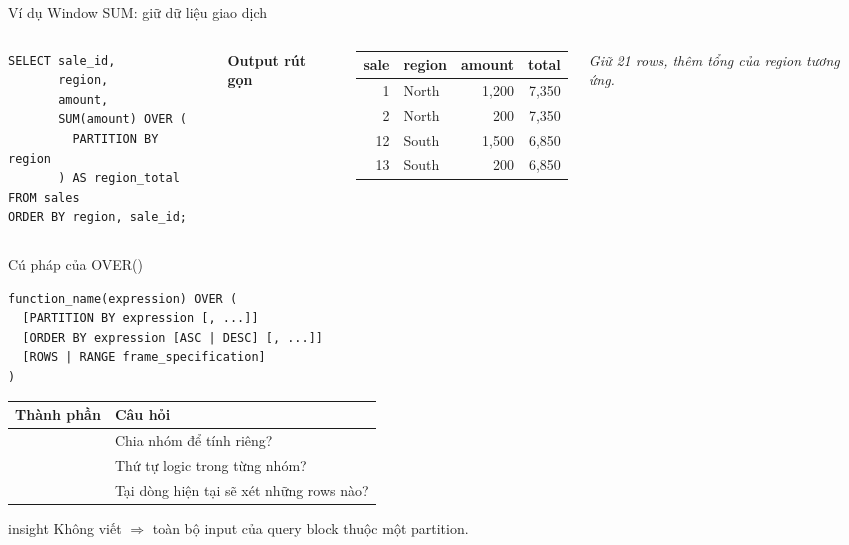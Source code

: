 \documentclass[aspectratio=169,11pt]{beamer}
\newcommand{\code}[1]{{\small\ttfamily\detokenize{#1}}}
\begin{document}
\begin{frame}[fragile]{Ví dụ Window SUM: giữ dữ liệu giao dịch}
\begin{columns}[T,onlytextwidth]
\begin{lstlisting}[basicstyle=\ttfamily\fontsize{8.3}{9.5}\selectfont]
SELECT sale_id,
       region,
       amount,
       SUM(amount) OVER (
         PARTITION BY region
       ) AS region_total
FROM sales
ORDER BY region, sale_id;
\end{lstlisting}

\footnotesize\textbf{Output rút gọn}
\begin{center}
\renewcommand{\arraystretch}{1.18}
\begin{tabular}{rlrr}
\toprule
sale & region & amount & total \\
\midrule
1 & North & 1,200 & 7,350 \\
2 & North & 200 & 7,350 \\
12 & South & 1,500 & 6,850 \\
13 & South & 200 & 6,850 \\
\bottomrule
\end{tabular}
\end{center}\small\textit{Giữ 21 rows, thêm tổng của region tương ứng.}
\end{columns}
\end{frame}

\begin{frame}[fragile]{Cú pháp của OVER()}

\begin{lstlisting}[basicstyle=\ttfamily\fontsize{10}{11.2}\selectfont]
function_name(expression) OVER (
  [PARTITION BY expression [, ...]]
  [ORDER BY expression [ASC | DESC] [, ...]]
  [ROWS | RANGE frame_specification]
)
\end{lstlisting}
\vspace{0.9em}
\begin{center}
\renewcommand{\arraystretch}{1.18}
\begin{tabular}{ll}
\toprule
Thành phần & Câu hỏi \\
\midrule
\code{PARTITION BY} & Chia nhóm để tính riêng? \\
\code{ORDER BY} & Thứ tự logic trong từng nhóm? \\
\code{Frame} & Tại dòng hiện tại sẽ xét những rows nào? \\
\bottomrule
\end{tabular}
\end{center}
\par\vspace{0.4em}
\begin{beamercolorbox}[wd=\linewidth,sep=1.1ex,rounded=true]{insight}
Không viết \code{PARTITION BY} $\Rightarrow$ toàn bộ input của query block thuộc một partition.
\end{beamercolorbox}
\end{frame}
\end{document}
